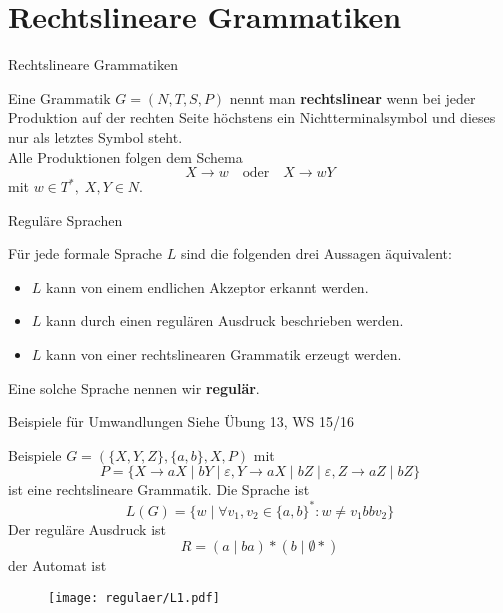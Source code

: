 
\section{Rechtslineare Grammatiken}
\begin{frame}{Rechtslineare Grammatiken}
	\begin{Definition}
		Eine Grammatik $G = (N, T, S, P)$ nennt man \textbf{rechtslinear} wenn bei jeder Produktion auf der rechten Seite höchstens ein Nichtterminalsymbol und dieses nur als letztes Symbol steht.\\
		Alle Produktionen folgen dem Schema $$X \to w \quad \text{oder} \quad X \to wY$$ mit $w \in T^*, \; X,Y \in N$.
	\end{Definition}
\end{frame}

\begin{frame}{Reguläre Sprachen}
	\begin{Satz}
		Für jede formale Sprache $L$ sind die folgenden drei Aussagen äquivalent:
		\begin{itemize}
			\item $L$ kann von einem endlichen Akzeptor erkannt werden.
			\item $L$ kann durch einen regulären Ausdruck beschrieben werden.
			\item $L$ kann von einer rechtslinearen Grammatik erzeugt werden.
		\end{itemize}
	\end{Satz}
	
	Eine solche Sprache nennen wir \textbf{regulär}.
\end{frame}

\begin{frame}{Beispiele für Umwandlungen}
	Siehe Übung 13, WS 15/16
\end{frame}

\begin{frame}{Beispiele}
	$G = (\{X, Y, Z\}, \{a, b\}, X, P )$ mit $$P = \{X \to aX \mid bY \mid \varepsilon, Y \to aX \mid bZ \mid \varepsilon, Z \to aZ \mid bZ\}$$ ist eine rechtslineare Grammatik. Die Sprache ist \pause $$L(G) = \{ w \mid \forall v_1, v_2 \in \{a,b\}^\ast: w \neq v_1 bb v_2 \}$$ Der reguläre Ausdruck ist \pause $$R =  (a\mid ba)\ast (b \mid \emptyset *)  $$ der Automat ist 
\end{frame}

\begin{frame}
	\begin{figure}[H]
		\centering
		\texttt{[image: regulaer/L1.pdf]}
	\end{figure}
\end{frame}

